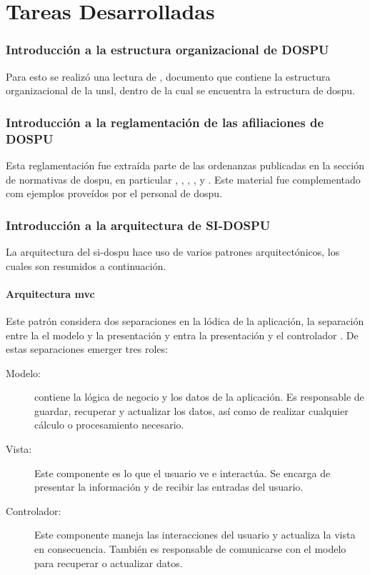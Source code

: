 \section{Tareas Desarrolladas}

\subsubsection{Introducción a la estructura organizacional de DOSPU}
Para esto se realizó una lectura de \cite{CSOrd17}, documento que contiene la estructura organizacional de la \acrshort{unsl}, dentro de la cual se encuentra la estructura de \acrshort{dospu}.

\subsubsection{Introducción a la reglamentación de las afiliaciones de DOSPU}\label{para:afiliaciones}
Esta reglamentación fue extraída parte de las ordenanzas publicadas en la sección de normativas de \acrshort{dospu}, en particular \cite{dospuRes21}, \cite{dospuRes71}, \cite{dospuRes31}, \cite{dospuRes43}, \cite{dospuRes7} y \cite{CSOrd53}. Este material fue complementado com ejemplos proveídos por el personal de \acrshort{dospu}.

\subsubsection{Introducción a la arquitectura de SI-DOSPU}
La arquitectura del \acrshort{si}-\acrshort{dospu} hace uso de varios patrones arquitectónicos, los cuales son resumidos a continuación.

\paragraph{Arquitectura \acrshort{mvc}}
Este patrón considera dos separaciones en la lódica de la aplicación, la separación entre la el modelo y la presentación y entra la presentación y el controlador \cite{fowlerPatterns}. De estas separaciones emerger tres roles:

\begin{description}
    \item[Modelo:] contiene la lógica de negocio y los datos de la aplicación. Es responsable de guardar, recuperar y actualizar los datos, así como de realizar cualquier cálculo o procesamiento necesario.
    \item[Vista:] Este componente es lo que el usuario ve e interactúa. Se encarga de presentar la información y de recibir las entradas del usuario.
    \item[Controlador:] Este componente maneja las interacciones del usuario y actualiza la vista en consecuencia. También es responsable de comunicarse con el modelo para recuperar o actualizar datos.
\end{description}

